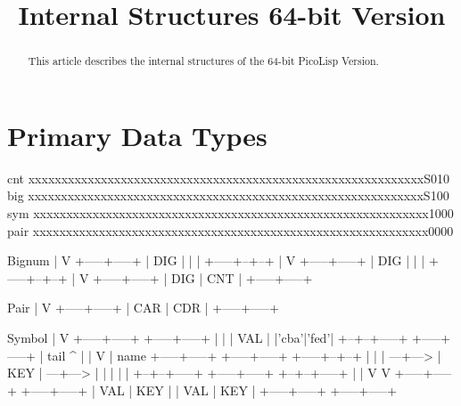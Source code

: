 \title{Internal Structures 64-bit Version}

\maketitle

\begin{abstract}
  This article describes the internal structures of the 64-bit
  PicoLisp Version. 
\end{abstract}

\section{Primary Data Types}
\label{sec:internal-structures-primary-data-types}

\begin{wideverbatim}
cnt   xxxxxxxxxxxxxxxxxxxxxxxxxxxxxxxxxxxxxxxxxxxxxxxxxxxxxxxxxxxxS010
big   xxxxxxxxxxxxxxxxxxxxxxxxxxxxxxxxxxxxxxxxxxxxxxxxxxxxxxxxxxxxS100
sym   xxxxxxxxxxxxxxxxxxxxxxxxxxxxxxxxxxxxxxxxxxxxxxxxxxxxxxxxxxxx1000
pair  xxxxxxxxxxxxxxxxxxxxxxxxxxxxxxxxxxxxxxxxxxxxxxxxxxxxxxxxxxxx0000




\end{wideverbatim}

\begin{wideverbatim}



      Bignum
      |
      V
   +-----+-----+
   | DIG |  |  |
   +-----+--+--+
            |
            V
         +-----+-----+
         | DIG |  |  |
         +-----+--+--+
                  |
                  V
               +-----+-----+
               | DIG | CNT |
               +-----+-----+


   Pair
   |
   V
   +-----+-----+
   | CAR | CDR |
   +-----+-----+


         Symbol
         |
         V
   +-----+-----+                                +-----+-----+
   |  |  | VAL |                                |'cba'|'fed'|
   +--+--+-----+                                +-----+-----+
      | tail                                       ^
      |                                            |
      V                                            | name
      +-----+-----+     +-----+-----+     +-----+--+--+
      |  |  |  ---+---> | KEY |  ---+---> |  |  |  |  |
      +--+--+-----+     +-----+-----+     +--+--+-----+
         |                                   |
         V                                   V
         +-----+-----+                       +-----+-----+
         | VAL | KEY |                       | VAL | KEY |
         +-----+-----+                       +-----+-----+




\end{wideverbatim}

